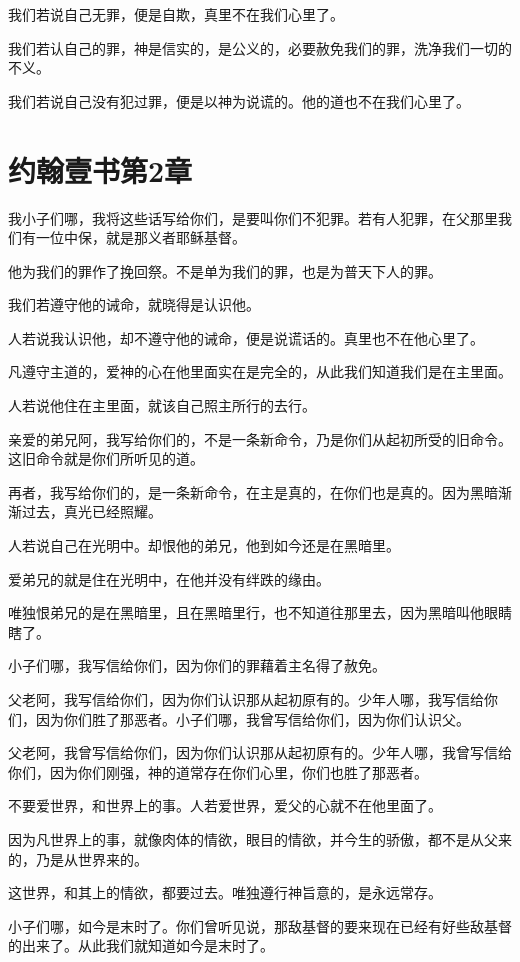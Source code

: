 \documentclass[12pt,oneside]{book}
\begin{document}
我们若说自己无罪，便是自欺，真里不在我们心里了。

我们若认自己的罪，神是信实的，是公义的，必要赦免我们的罪，洗净我们一切的不义。

我们若说自己没有犯过罪，便是以神为说谎的。他的道也不在我们心里了。

\chapter{约翰壹书第2章}
我小子们哪，我将这些话写给你们，是要叫你们不犯罪。若有人犯罪，在父那里我们有一位中保，就是那义者耶稣基督。

他为我们的罪作了挽回祭。不是单为我们的罪，也是为普天下人的罪。

我们若遵守他的诫命，就晓得是认识他。

人若说我认识他，却不遵守他的诫命，便是说谎话的。真里也不在他心里了。

凡遵守主道的，爱神的心在他里面实在是完全的，从此我们知道我们是在主里面。

人若说他住在主里面，就该自己照主所行的去行。

亲爱的弟兄阿，我写给你们的，不是一条新命令，乃是你们从起初所受的旧命令。这旧命令就是你们所听见的道。

再者，我写给你们的，是一条新命令，在主是真的，在你们也是真的。因为黑暗渐渐过去，真光已经照耀。

人若说自己在光明中。却恨他的弟兄，他到如今还是在黑暗里。

爱弟兄的就是住在光明中，在他并没有绊跌的缘由。

唯独恨弟兄的是在黑暗里，且在黑暗里行，也不知道往那里去，因为黑暗叫他眼睛瞎了。

小子们哪，我写信给你们，因为你们的罪藉着主名得了赦免。

父老阿，我写信给你们，因为你们认识那从起初原有的。少年人哪，我写信给你们，因为你们胜了那恶者。小子们哪，我曾写信给你们，因为你们认识父。

父老阿，我曾写信给你们，因为你们认识那从起初原有的。少年人哪，我曾写信给你们，因为你们刚强，神的道常存在你们心里，你们也胜了那恶者。

不要爱世界，和世界上的事。人若爱世界，爱父的心就不在他里面了。

因为凡世界上的事，就像肉体的情欲，眼目的情欲，并今生的骄傲，都不是从父来的，乃是从世界来的。

这世界，和其上的情欲，都要过去。唯独遵行神旨意的，是永远常存。

小子们哪，如今是末时了。你们曾听见说，那敌基督的要来现在已经有好些敌基督的出来了。从此我们就知道如今是末时了。
\end{document}
